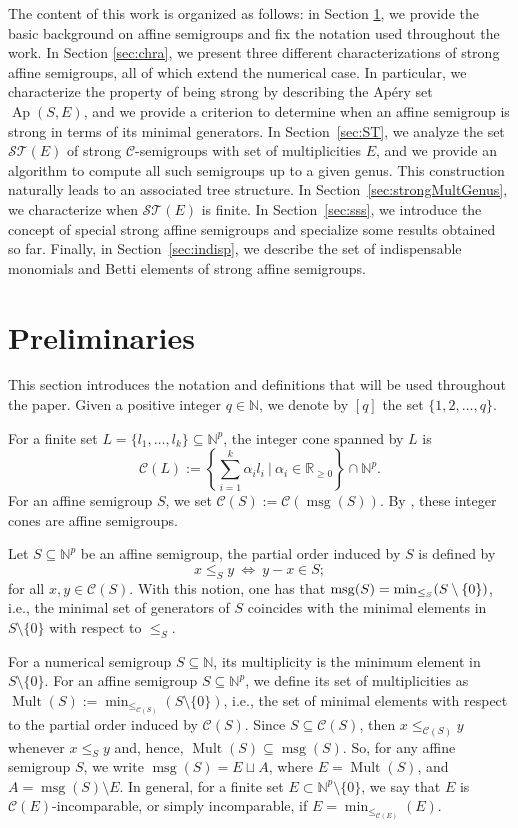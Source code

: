 \documentclass[a4paper,11pt]{article}
\def\CaC{\mathcal{C}}
\def\N{\mathbb{N}}
\def\msg{\operatorname{msg}}
\def\Ap{\operatorname{Ap}}
\def\Mult{\operatorname{Mult}}
\begin{document}
{The content of this work is organized as follows: in Section \ref{sec:Preli}, we provide the basic background on affine semigroups and fix the notation used throughout the work.
In Section \ref{sec:chra}, we present three different characterizations of strong affine semigroups, all of which extend the numerical case. In particular, we characterize the property of being strong by describing the Apéry set $\Ap(S,E)$, and we provide a criterion to determine when an affine semigroup is strong in terms of its minimal generators.
In Section~\ref{sec:ST}, we analyze the set $\mathcal{ST}(E)$ of strong $\CaC$-semigroups with set of multiplicities $E$, and we provide an algorithm to compute all such semigroups up to a given genus. This construction naturally leads to an associated tree structure. In Section~\ref{sec:strongMultGenus}, we characterize when $\mathcal{ST}(E)$ is finite. In Section~\ref{sec:sss}, we introduce the concept of special strong affine semigroups and specialize some results obtained so far. Finally, in Section~\ref{sec:indisp}, we describe the set of indispensable monomials and Betti elements of strong affine semigroups.

\section{Preliminaries}\label{sec:Preli}

This section introduces the notation and definitions that will be used throughout the paper. Given a positive integer $q\in \N$, we denote by $[q]$ the set $\{1,2, \ldots, q\}$.

For a finite set $L =  \{l_1,\ldots,l_k\} \subseteq \mathbb N^p$, the integer cone spanned by $L$  is
\[ \CaC(L) := \left\{ \sum_{i = 1}^k \alpha_i l_i \ \vert \ \alpha_i \in \mathbb R_{\geq 0} \right\} \cap \N^p.\]
For an affine semigroup $S$, we set $\CaC(S) := \CaC(\msg(S))$. By \cite[Corollary 2.10]{Bruns}, these integer cones are affine semigroups.

Let $S \subseteq \mathbb{N}^p$ be an affine semigroup, the partial order induced by $S$ is defined by  \[ x \le_S y  \ \Longleftrightarrow \ y - x \in S;\] for all $x,y \in \CaC(S)$. With this notion, one has that $\msg(S) = {\rm min}_{\le_S}(S\setminus\{0\})$, i.e., the minimal set of generators of $S$ coincides with the minimal elements in $S \setminus\{0\}$ with respect to $\le_S$.

For a numerical semigroup $S\subseteq\N$, its multiplicity is the minimum element in $S\setminus\{0\}$.
For an affine semigroup $S \subseteq \N^p$, we define its set of multiplicities as $\Mult (S):=\min _{\le_{\CaC(S)}} (S\setminus\{0\})$, i.e., the set of minimal elements with respect to the partial order induced by $\CaC(S)$. Since $S \subseteq \CaC(S)$, then $x \le_{\CaC(S)} y$ whenever  $x \le_S y$ and, hence, $\Mult(S) \subseteq \msg(S)$. So, for any affine semigroup $S$, we write $\msg(S)=E\sqcup A$, where $E=\Mult (S)$, and $A=\msg(S)\setminus E$.
In general, for a finite set $E\subset \N^p\setminus \{0\}$, we say that $E$ is $\CaC(E)$-incomparable, or simply incomparable, if $E=\min _{\le_{\CaC(E)}} (E)$.

}
\end{document}
